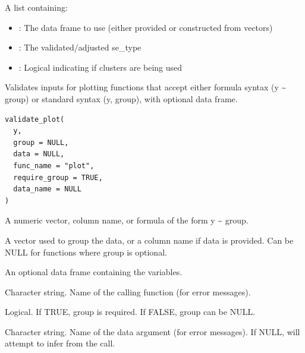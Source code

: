 \documentclass[a4paper]{book}
\begin{document}
%
\begin{Value}
A list containing:
\begin{itemize}

\item{} : The data frame to use (either provided or constructed from vectors)
\item{} : The validated/adjusted se\_type
\item{} : Logical indicating if clusters are being used

\end{itemize}

\end{Value}
%
\begin{Description}
Validates inputs for plotting functions that accept either formula syntax
(y \textasciitilde{} group) or standard syntax (y, group), with optional data frame.
\end{Description}
%
\begin{Usage}
\begin{verbatim}
validate_plot(
  y,
  group = NULL,
  data = NULL,
  func_name = "plot",
  require_group = TRUE,
  data_name = NULL
)
\end{verbatim}
\end{Usage}
%
\begin{Arguments}
\begin{ldescription}
\item[\code{y}] A numeric vector, column name, or formula of the form y \textasciitilde{} group.

\item[\code{group}] A vector used to group the data, or a column name if data is provided.
Can be NULL for functions where group is optional.

\item[\code{data}] An optional data frame containing the variables.

\item[\code{func\_name}] Character string. Name of the calling function (for error messages).

\item[\code{require\_group}] Logical. If TRUE, group is required. If FALSE, group can be NULL.

\item[\code{data\_name}] Character string. Name of the data argument (for error messages). 
If NULL, will attempt to infer from the call.
\end{ldescription}
\end{Arguments}
\end{document}
